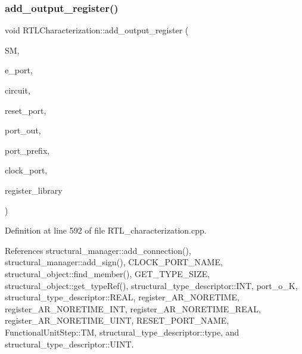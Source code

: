 \subsubsection{\texorpdfstring{add\+\_\+output\+\_\+register()}{add\_output\_register()}}
{\footnotesize\ttfamily void R\+T\+L\+Characterization\+::add\+\_\+output\+\_\+register (\begin{DoxyParamCaption}\item[{\hyperlink{structural__manager_8hpp_ab3136f0e785d8535f8d252a7b53db5b5}{structural\+\_\+manager\+Ref}}]{SM,  }\item[{\hyperlink{structural__objects_8hpp_a8ea5f8cc50ab8f4c31e2751074ff60b2}{structural\+\_\+object\+Ref}}]{e\+\_\+port,  }\item[{\hyperlink{structural__objects_8hpp_a8ea5f8cc50ab8f4c31e2751074ff60b2}{structural\+\_\+object\+Ref}}]{circuit,  }\item[{\hyperlink{structural__objects_8hpp_a8ea5f8cc50ab8f4c31e2751074ff60b2}{structural\+\_\+object\+Ref}}]{reset\+\_\+port,  }\item[{\hyperlink{structural__objects_8hpp_a8ea5f8cc50ab8f4c31e2751074ff60b2}{structural\+\_\+object\+Ref}}]{port\+\_\+out,  }\item[{const std\+::string \&}]{port\+\_\+prefix,  }\item[{\hyperlink{structural__objects_8hpp_a8ea5f8cc50ab8f4c31e2751074ff60b2}{structural\+\_\+object\+Ref}}]{clock\+\_\+port,  }\item[{const std\+::string \&}]{register\+\_\+library }\end{DoxyParamCaption})\hspace{0.3cm}{\ttfamily [private]}}



Definition at line 592 of file R\+T\+L\+\_\+characterization.\+cpp.



References structural\+\_\+manager\+::add\+\_\+connection(), structural\+\_\+manager\+::add\+\_\+sign(), C\+L\+O\+C\+K\+\_\+\+P\+O\+R\+T\+\_\+\+N\+A\+ME, structural\+\_\+object\+::find\+\_\+member(), G\+E\+T\+\_\+\+T\+Y\+P\+E\+\_\+\+S\+I\+ZE, structural\+\_\+object\+::get\+\_\+type\+Ref(), structural\+\_\+type\+\_\+descriptor\+::\+I\+NT, port\+\_\+o\+\_\+K, structural\+\_\+type\+\_\+descriptor\+::\+R\+E\+AL, register\+\_\+\+A\+R\+\_\+\+N\+O\+R\+E\+T\+I\+ME, register\+\_\+\+A\+R\+\_\+\+N\+O\+R\+E\+T\+I\+M\+E\+\_\+\+I\+NT, register\+\_\+\+A\+R\+\_\+\+N\+O\+R\+E\+T\+I\+M\+E\+\_\+\+R\+E\+AL, register\+\_\+\+A\+R\+\_\+\+N\+O\+R\+E\+T\+I\+M\+E\+\_\+\+U\+I\+NT, R\+E\+S\+E\+T\+\_\+\+P\+O\+R\+T\+\_\+\+N\+A\+ME, Functional\+Unit\+Step\+::\+TM, structural\+\_\+type\+\_\+descriptor\+::type, and structural\+\_\+type\+\_\+descriptor\+::\+U\+I\+NT.



